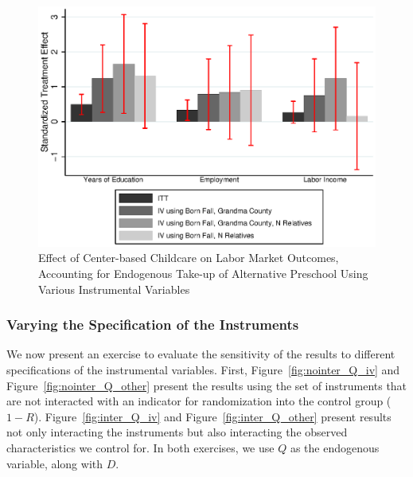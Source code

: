 \begin{figure}[H]
		\caption{Effect of Center-based Childcare on Labor Market Outcomes, Accounting for Endogenous Take-up of Alternative Preschool Using Various Instrumental Variables} \label{fig:ins_inter_Q_iv2}
		\includegraphics[width=.8\columnwidth]{output/appendixplots/ins_inter_Q_iv_other.eps}
\end{figure}

\subsubsection{Varying the Specification of the Instruments}

\noindent We now present an exercise to evaluate the sensitivity of the results to different specifications of the instrumental variables. First, Figure~\ref{fig:nointer_Q_iv} and Figure~\ref{fig:nointer_Q_other} present the results using the set of instruments that are not interacted with an indicator for randomization into the control group ($1-R$). Figure~\ref{fig:inter_Q_iv} and Figure~\ref{fig:inter_Q_other} present results not only interacting the instruments but also interacting the observed characteristics we control for. In both exercises, we use $Q$ as the endogenous variable, along with $D$.\\

